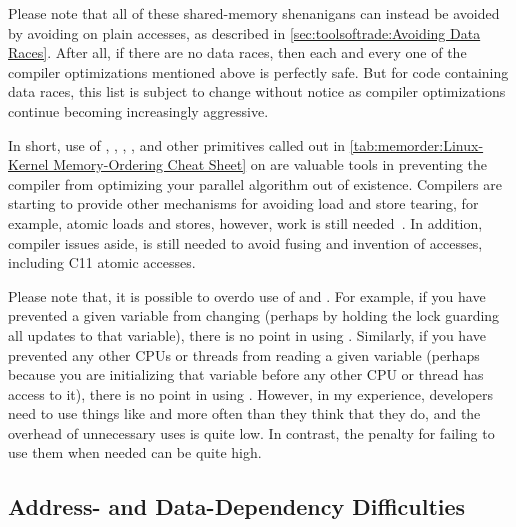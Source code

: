 \QuickQuizEnd

Please note that all of these shared-memory shenanigans can instead be
avoided by avoiding  on plain accesses, as described in
\cref{sec:toolsoftrade:Avoiding Data Races}.
After all, if there are no data races, then each and every one of the
compiler optimizations mentioned above is perfectly safe.
But for code containing data races, this list is subject to change
without notice as compiler optimizations continue becoming increasingly
aggressive.

In short, use of , , ,
, and other primitives called out in
\cref{tab:memorder:Linux-Kernel Memory-Ordering Cheat Sheet}
on
are valuable tools in preventing the compiler from
optimizing your parallel algorithm out of existence.
Compilers are starting to provide other mechanisms for avoiding
load and store tearing, for example, 
atomic loads and stores, however, work is still
needed~\cite{JonathanCorbet2016C11atomics}.
In addition, compiler issues aside,  is still needed
to avoid fusing and invention of accesses, including C11 atomic accesses.

Please note that, it is possible to overdo use of  and
.
For example, if you have prevented a given variable from changing
(perhaps by holding the lock guarding all updates to that
variable), there is no point in using .
Similarly, if you have prevented any other CPUs or threads from
reading a given variable (perhaps because you are initializing
that variable before any other CPU or thread has access to it),
there is no point in using .
However, in my experience, developers need to use things like
 and  more often than they think that
they do, and the overhead of unnecessary uses is quite low.
In contrast, the penalty for failing to use them when needed can be quite high.

\subsection{Address- and Data-Dependency Difficulties}
\label{sec:memorder:Address- and Data-Dependency Difficulties}

